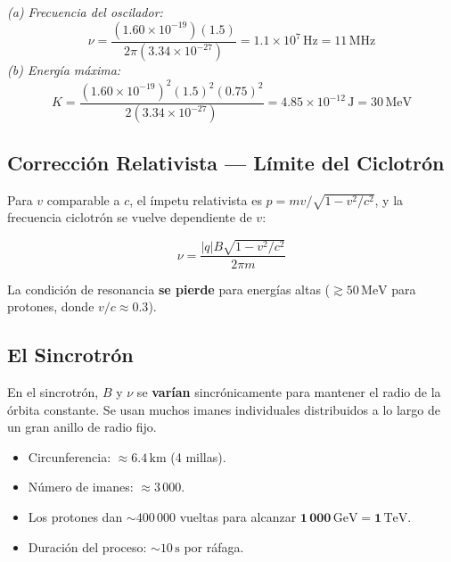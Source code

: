 \documentclass[12pt, letterpaper]{report}
\numberwithin{equation}{section}
\newcommand{\un}[1]{\,\mathrm{#1}}            %
\begin{document}
\begin{tcolorbox}[exbox,
  title=Ejemplo — Ciclotrón para deuterones ($R=75\un{cm}$,
  $B=1.5\un{T}$; $m_d=3.34\times10^{-27}\un{kg}$, $q=+e$)]
  \textit{(a) Frecuencia del oscilador:}
  \[
    \nu = \frac{(1.60\times10^{-19})(1.5)}
              {2\pi(3.34\times10^{-27})}
        = 1.1\times10^{7}\un{Hz} = 11\un{MHz}
  \]
  \textit{(b) Energía máxima:}
  \[
    K = \frac{(1.60\times10^{-19})^2(1.5)^2(0.75)^2}
            {2(3.34\times10^{-27})}
      = 4.85\times10^{-12}\un{J} = 30\un{MeV}
  \]
\end{tcolorbox}

\subsection{Corrección Relativista — Límite del Ciclotrón}

Para $v$ comparable a $c$, el ímpetu relativista es
$p=mv/\!\sqrt{1-v^2/c^2}$, y la frecuencia ciclotrón se vuelve
dependiente de $v$:

\begin{equation}
  \nu = \frac{|q|B\sqrt{1-v^2/c^2}}{2\pi m}
  \label{eq:nu_rel}
\end{equation}

La condición de resonancia \textbf{se pierde} para energías altas
($\gtrsim50\un{MeV}$ para protones, donde $v/c\approx0.3$).

\subsection{El Sincrotrón}

En el sincrotrón, $B$ y $\nu$ se \textbf{varían} sincrónicamente para
mantener el radio de la órbita constante. Se usan muchos imanes individuales
distribuidos a lo largo de un gran anillo de radio fijo.

\begin{tcolorbox}[exbox, title=Sincrotrón del Fermilab (referencia histórica)]
  \begin{itemize}[leftmargin=1.5em, itemsep=2pt]
    \item Circunferencia: $\approx6.4\un{km}$ (4 millas).
    \item Número de imanes: $\approx3\,000$.
    \item Los protones dan $\sim400\,000$ vueltas para alcanzar
          $\mathbf{1\,000\un{GeV}=1\un{TeV}}$.
    \item Duración del proceso: $\sim10\un{s}$ por ráfaga.
  \end{itemize}
\end{tcolorbox}
\end{document}
